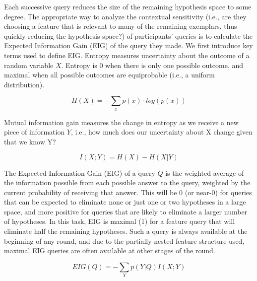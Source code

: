 \documentclass[10pt,letterpaper]{article}
\begin{document}
Each successive query reduces the size of the remaining hypothesis space to some 
degree. The appropriate way to analyze the contextual sensitivity (i.e., are they 
choosing a feature that is relevant to many of the remaining exemplars, thus quickly 
reducing the hypothesis space?) of participants' queries is to calculate the Expected 
Information Gain (EIG) of the query they made. We first introduce key terms used to 
define EIG. Entropy measures uncertainty about the outcome of a random variable 
$X$. Entropy is 0 when there is only one possible outcome, and maximal when all 
possible outcomes are equiprobable (i.e., a uniform distribution).

\begin{equation}
  H(X) = -\sum_{x} p(x) \cdot log(p(x))
\end{equation}

Mutual information gain measures the change in entropy as we receive a new piece 
of information $Y$, i.e., how much does our uncertainty about X change given that 
we know Y?

\begin{equation}
  I(X;Y) = H(X) - H(X|Y)
\end{equation}

The Expected Information Gain (EIG) of a query $Q$ is the weighted average of the 
information possible from each possible answer to the query, weighted by the 
current probability of receiving that answer. This will be 0 (or near-0) for queries that 
can be expected to eliminate none or just one or two hypotheses in a large space, 
and more positive for queries that are likely to eliminate a larger number of 
hypotheses. In this task, EIG is maximal (1) for a feature query that will eliminate 
half the remaining hypotheses. Such a query is always available at the beginning of 
any round, and due to the partially-nested feature structure used, maximal EIG 
queries are often available at other stages of the round.

\begin{equation}
  EIG(Q) = -\sum_{Y} p(Y|Q) I(X;Y)
\end{equation}
\end{document}
